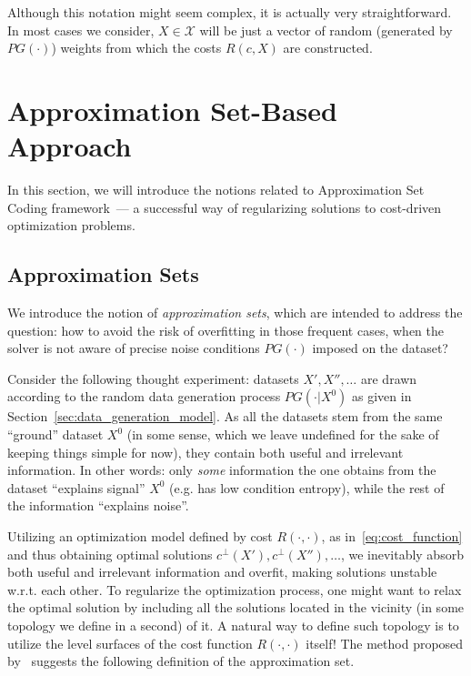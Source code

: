 \myremark Although this notation might seem complex, it is actually very
straightforward. In most cases we consider, $X \in \mathcal{X}$ will be just a
vector of random (generated by $PG(\cdot)$) weights from which the costs $R(c,
X)$ are constructed.

\section{Approximation Set-Based Approach}
\label{sec:asc_original}

In this section, we will introduce the notions related to Approximation Set
Coding framework~--- a successful way of regularizing solutions to cost-driven
optimization problems.

\subsection{Approximation Sets}

We introduce the notion of \textit{approximation sets}, which are intended to
address the question: how to avoid the risk of overfitting in those frequent
cases, when the solver is not aware of precise noise conditions $PG(\cdot)$
imposed on the dataset?

Consider the following thought experiment: datasets $X', X'', \ldots$ are drawn
according to the random data generation process $PG(\cdot | X^0)$ as given in
Section~\ref{sec:data_generation_model}. As all the datasets stem from the same
``ground'' dataset $X^0$ (in some sense, which we leave undefined  for the sake
of keeping things simple for now), they contain both useful and irrelevant
information. In other words: only \textit{some} information the one obtains from
the dataset ``explains signal'' $X^0$ (e.g. has low condition entropy), while
the rest of the information ``explains noise''.

Utilizing an optimization model defined by cost $R(\cdot, \cdot)$, as
in~\eqref{eq:cost_function} and thus obtaining optimal solutions $c^\bot(X'),
c^\bot(X''), \ldots$, we inevitably absorb both useful and irrelevant information
and overfit, making solutions unstable w.r.t. each other. To regularize the
optimization process, one might want to relax the optimal solution by including
all the solutions located in the vicinity (in some topology we define in a
second) of it. A natural way to define such topology is to utilize the level
surfaces of the cost function $R(\cdot, \cdot)$ itself! The method proposed
by~\citet{conf/isit/Buhmann10} suggests the following definition of the
approximation set.

